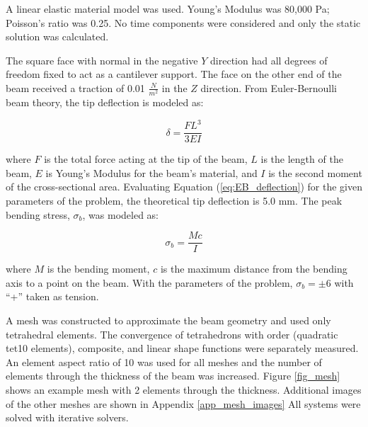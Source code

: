 \documentclass[a4paper, 12pt]{article}
\begin{document}
A linear elastic material model was used. 
Young's Modulus was 80,000 Pa;
Poisson's ratio was 0.25.
No time components were considered
and only the static solution was calculated.

The square face with normal in the negative $Y$ direction had 
all degrees of freedom fixed to act as a cantilever support. 
The face on the other end of the beam received a 
traction of 0.01 $\frac{N}{m^2}$ in the $Z$ direction.
From Euler-Bernoulli beam theory, the tip deflection
is modeled as:

\begin{equation}
  \delta = \frac{F L^3}{3 E I}
  \label{eq:EB_deflection}
\end{equation}

\noindent
where 
$F$ is the total force acting at the tip of the beam, 
$L$ is the length of the beam,
$E$ is Young's Modulus for the beam's material,
and
$I$ is the second moment of the cross-sectional area.
Evaluating Equation (\ref{eq:EB_deflection}) for the
given parameters of the problem, 
the theoretical tip deflection is 5.0 mm.
The peak bending stress, $\sigma_b$, was modeled as:

\begin{equation}
\sigma_b = \frac{M c}{I}
\end{equation}

\noindent
where $M$ is the bending moment, 
$c$ is the maximum distance from the bending axis to a point on the beam.
With the parameters of the problem, $\sigma_b = \pm 6$ 
with ``+'' taken as tension.


A mesh was constructed to approximate the beam geometry
and used only tetrahedral elements.
The convergence of 
tetrahedrons with  order (quadratic tet10 elements),
composite, and linear shape functions
were separately measured.
An element aspect ratio of 10 was used for all meshes
and the number of elements through the thickness of the beam was increased.
Figure \ref{fig_mesh} shows an example mesh with 2 elements through the 
thickness. 
Additional images of the other meshes are shown in Appendix \ref{app_mesh_images}
All systems were solved with iterative solvers.
\end{document}
